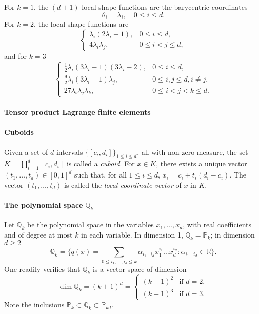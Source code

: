 For $k=1$, the $(d+1)$ local shape functions are the barycentric coordinates
\begin{equation}
    \theta_i = \lambda_i, \quad 0 \le i \le d.
\end{equation}
For $k=2$, the local shape functions are
\begin{equation}
    \begin{cases} \lambda_i(2\lambda_i - 1), & 0 \le i \le d, \\ 4\lambda_i \lambda_j, & 0 \le i < j \le d, \end{cases}
\end{equation}
and for $k=3$
\begin{equation}
    \begin{cases} \frac{1}{2}\lambda_i(3\lambda_i - 1)(3\lambda_i - 2), & 0 \le i \le d, \\ \frac{9}{2}\lambda_i(3\lambda_i - 1)\lambda_j, & 0 \le i,j \le d, i \ne j, \\ 27\lambda_i \lambda_j \lambda_k, & 0 \le i < j < k \le d. \end{cases}
\end{equation}
\paragraph{Tensor product Lagrange finite elements}
\paragraph{Cuboids} Given a set of $d$ intervals $\{[c_i, d_i]\}_{1 \le i \le d}$, all with non-zero measure, the set $K = \prod_{i=1}^d [c_i, d_i]$ is called a \emph{cuboid}. For $x \in K$, there exists a unique vector $(t_1, \dots, t_d) \in [0, 1]^d$ such that, for all $1 \le i \le d$, $x_i = c_i + t_i(d_i - c_i)$. The vector $(t_1, \dots, t_d)$ is called the \emph{local coordinate vector} of $x$ in $K$.

\paragraph{The polynomial space $\mathbb{Q}_k$} Let $\mathbb{Q}_k$ be the polynomial space in the variables $x_1, \dots, x_d$, with real coefficients and of degree at most $k$ in each variable. In dimension 1, $\mathbb{Q}_k = \mathbb{P}_k$; in dimension $d \ge 2$
\begin{equation}
    \mathbb{Q}_k = \{ q(x) = \sum_{0 \le i_1, \dots, i_d \le k} \alpha_{i_1 \dots i_d} x_1^{i_1} \dots x_d^{i_d} : \alpha_{i_1 \dots i_d} \in \mathbb{R} \}.
\end{equation}
One readily verifies that $\mathbb{Q}_k$ is a vector space of dimension
\begin{equation}
    \dim \mathbb{Q}_k = (k+1)^d = \begin{cases} (k+1)^2 & \text{if } d=2, \\ (k+1)^3 & \text{if } d=3. \end{cases}
\end{equation}
Note the inclusions $\mathbb{P}_k \subset \mathbb{Q}_k \subset \mathbb{P}_{kd}$.

